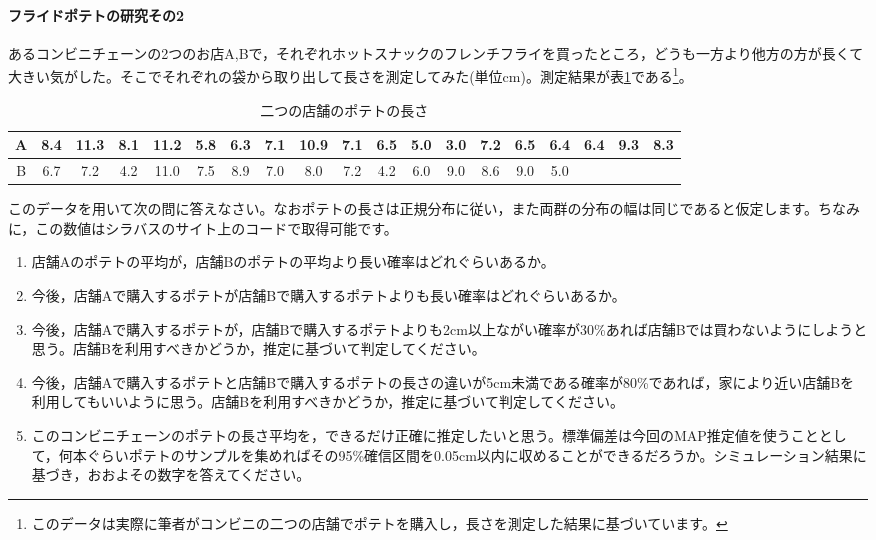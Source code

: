 \documentclass{ltjsbook}
\begin{document}
\paragraph{フライドポテトの研究その2}
あるコンビニチェーンの2つのお店A,Bで，それぞれホットスナックのフレンチフライを買ったところ，どうも一方より他方の方が長くて大きい気がした。そこでそれぞれの袋から取り出して長さを測定してみた(単位cm)。測定結果が表\ref{tab::20_01}である\footnote{このデータは実際に筆者がコンビニの二つの店舗でポテトを購入し，長さを測定した結果に基づいています。}。
\begin{table}[ht]
	\center
	\caption{二つの店舗のポテトの長さ}
	\begin{tabular}{c|cccccccccccccccccc}\hline
		A & 8.4 & 11.3 & 8.1 & 11.2 & 5.8 & 6.3 & 7.1 & 10.9 & 7.1 & 6.5 & 5.0 & 3.0 & 7.2 & 6.5 & 6.4 & 6.4 & 9.3 & 8.3 \\\hline
		B & 6.7 & 7.2  & 4.2 & 11.0 & 7.5 & 8.9 & 7.0 & 8.0  & 7.2 & 4.2 & 6.0 & 9.0 & 8.6 & 9.0 & 5.0 &     &     &     \\\hline
	\end{tabular}
	\label{tab::20_01}
\end{table}
このデータを用いて次の問に答えなさい。なおポテトの長さは正規分布に従い，また両群の分布の幅は同じであると仮定します。ちなみに，この数値はシラバスのサイト上のコードで取得可能です。
\begin{enumerate}
	\item 店舗Aのポテトの平均が，店舗Bのポテトの平均より長い確率はどれぐらいあるか。
	\item 今後，店舗Aで購入するポテトが店舗Bで購入するポテトよりも長い確率はどれぐらいあるか。
	\item 今後，店舗Aで購入するポテトが，店舗Bで購入するポテトよりも2cm以上ながい確率が30\%あれば店舗Bでは買わないようにしようと思う。店舗Bを利用すべきかどうか，推定に基づいて判定してください。
	\item 今後，店舗Aで購入するポテトと店舗Bで購入するポテトの長さの違いが5cm未満である確率が80\%であれば，家により近い店舗Bを利用してもいいように思う。店舗Bを利用すべきかどうか，推定に基づいて判定してください。
	\item このコンビニチェーンのポテトの長さ平均を，できるだけ正確に推定したいと思う。標準偏差は今回のMAP推定値を使うこととして，何本ぐらいポテトのサンプルを集めればその95\%確信区間を0.05cm以内に収めることができるだろうか。シミュレーション結果に基づき，おおよその数字を答えてください。
\end{enumerate}
\end{document}
